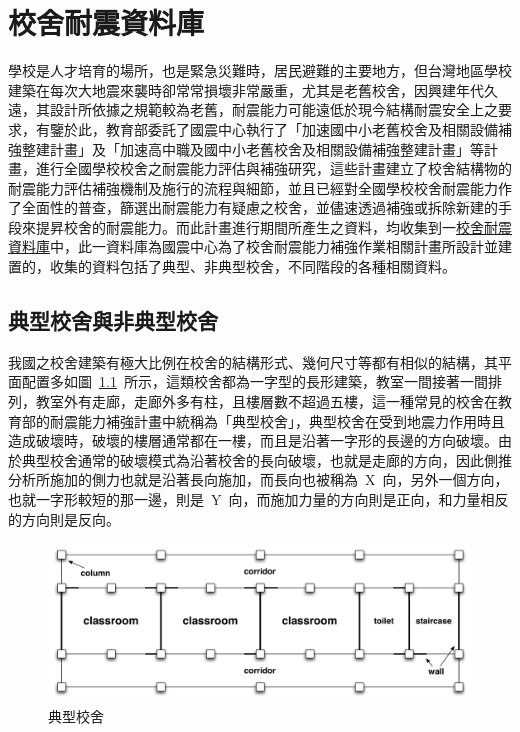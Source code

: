 \renewcommand\thetable{\arabic{chapter}-\arabic{table}}
\renewcommand{\theequation}{\arabic{chapter}-\arabic{equation}}
\chapter{校舍耐震資料庫}

學校是人才培育的場所，也是緊急災難時，居民避難的主要地方，但台灣地區學校建築在每次大地震來襲時卻常常損壞非常嚴重，尤其是老舊校舍，因興建年代久遠，其設計所依據之規範較為老舊，耐震能力可能遠低於現今結構耐震安全上之要求，有鑒於此，教育部委託了國震中心執行了「加速國中小老舊校舍及相關設備補強整建計畫」及「加速高中職及國中小老舊校舍及相關設備補強整建計畫」等計畫，進行全國學校校舍之耐震能力評估與補強研究，這些計畫建立了校舍結構物的耐震能力評估補強機制及施行的流程與細節，並且已經對全國學校校舍耐震能力作了全面性的普查，篩選出耐震能力有疑慮之校舍，並儘速透過補強或拆除新建的手段來提昇校舍的耐震能力。而此計畫進行期間所產生之資料，均收集到一\underline{校舍耐震資料庫}中，此一資料庫為國震中心為了校舍耐震能力補強作業相關計畫所設計並建置的，收集的資料包括了典型、非典型校舍，不同階段的各種相關資料。

\section{典型校舍與非典型校舍}

我國之校舍建築有極大比例在校舍的結構形式、幾何尺寸等都有相似的結構，其平面配置多如圖~\ref{fig:TSB}~所示，這類校舍都為一字型的長形建築，教室一間接著一間排列，教室外有走廊，走廊外多有柱，且樓層數不超過五樓，這一種常見的校舍在教育部的耐震能力補強計畫中統稱為「典型校舍」，典型校舍在受到地震力作用時且造成破壞時，破壞的樓層通常都在一樓，而且是沿著一字形的長邊的方向破壞。由於典型校舍通常的破壞模式為沿著校舍的長向破壞，也就是走廊的方向，因此側推分析所施加的側力也就是沿著長向施加，而長向也被稱為~X~向，另外一個方向，也就一字形較短的那一邊，則是~Y~向，而施加力量的方向則是正向，和力量相反的方向則是反向。

\begin{figure}[hbtp]
  \begin{center}
    \includegraphics[width=1.0\textwidth]{figures/trad-school-building.pdf}
    \caption{典型校舍} 
    \label{fig:TSB}
  \end{center}
\end{figure}

